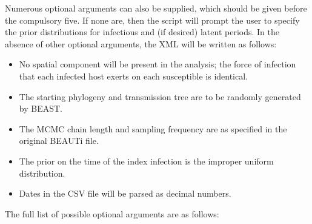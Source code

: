 \documentclass[]{article}
\begin{document}
Numerous optional arguments can also be supplied, which should be given before the compulsory five. If none are, then the script will prompt the user to specify the prior distributions for infectious and (if desired) latent periods. In the absence of other optional arguments, the XML will be written as follows:

\begin{itemize}
	\item{No spatial component will be present in the analysis; the force of infection that each infected host exerts on each susceptible is identical.} 
	\item{The starting phylogeny and transmission tree are to be randomly generated
		by BEAST.}
	\item{The MCMC chain length and sampling frequency are as specified in the original BEAUTi file.}
	\item{The prior on the time of the index infection is the improper uniform distribution.}
	\item{Dates in the CSV file will be parsed as decimal numbers.}
\end{itemize}

The full list of possible optional arguments are as follows:
\end{document}
